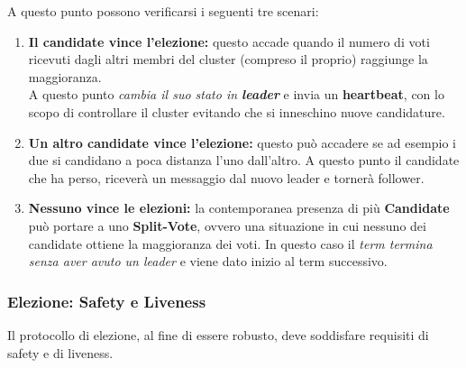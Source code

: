 A questo punto possono verificarsi i seguenti tre scenari:
\begin{enumerate}
	\item{\textbf{Il candidate vince l'elezione:}} questo accade quando il numero di voti ricevuti dagli altri membri del cluster (compreso il proprio) raggiunge la maggioranza.\\
	A questo punto \textit{cambia il suo stato in \textbf{leader}} e invia un \textbf{heartbeat}, con lo scopo di controllare il cluster evitando che si inneschino nuove candidature.

	\item{\textbf{Un altro candidate vince l'elezione:}} questo può accadere se ad esempio i due si candidano a poca distanza l'uno dall'altro. A questo punto il candidate che ha perso, riceverà un messaggio dal nuovo leader e tornerà follower.
	
	\item{\textbf{Nessuno vince le elezioni:}} la contemporanea presenza di più \textbf{Candidate} può portare a uno \textbf{Split-Vote}, ovvero una situazione in cui nessuno dei candidate ottiene la maggioranza dei voti. In questo caso il \textit{term termina senza aver avuto un leader} e viene dato inizio al term successivo.
\end{enumerate}

  \subsubsection{Elezione: Safety e Liveness}
  Il protocollo di elezione, al fine di essere robusto, deve soddisfare requisiti di safety e di liveness.
  
